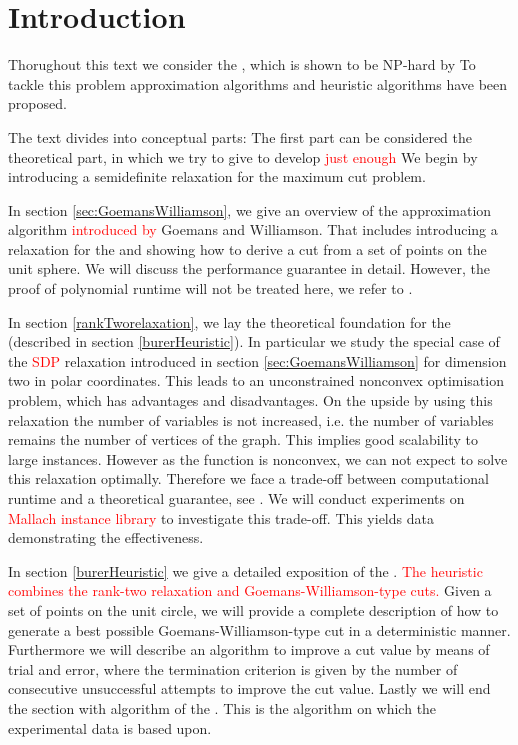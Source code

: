 \documentclass[12pt,a4paper]{article}
\theoremstyle{mythm}
\begin{document}
\tableofcontents

\section{Introduction} 
Thorughout this text we consider the \mcp, which is shown to be NP-hard by \cite{Garey1974}
To tackle this problem approximation algorithms and heuristic algorithms have been proposed.

The text divides into conceptual parts: The first part can be considered the theoretical part, in which we try to give to develop \textcolor{red}{just enough }
We begin by introducing a semidefinite relaxation for the maximum cut problem.

In section \ref{sec:GoemansWilliamson}, we give an overview of the approximation algorithm \textcolor{red}{introduced by} Goemans and Williamson. 
That includes introducing a \sdp relaxation for the \mcp and showing how to derive a cut from a set of points on the unit sphere.
We will discuss the performance guarantee in detail. 
However, the proof of polynomial runtime will not be treated here, we refer to \cite{Korte2018}.

In section \ref{rankTworelaxation}, we lay the theoretical foundation for the \BH (described in section \ref{burerHeuristic}).
In particular we study the special case of the \textcolor{red}{SDP} relaxation introduced in section \ref{sec:GoemansWilliamson} for dimension two in polar coordinates.
This leads to an unconstrained nonconvex optimisation problem, which has advantages and disadvantages.
On the upside by using this relaxation the number of variables is not increased, 
i.e. the number of variables remains the number of vertices of the graph.
This implies good scalability to large instances.
However as the function is nonconvex, we can not expect to solve this relaxation optimally.
Therefore we face a trade-off between computational runtime and a theoretical guarantee, see \cite[p. 506]{Burer2002}.
We will conduct experiments on \textcolor{red}{Mallach instance library} to investigate this trade-off. This yields data demonstrating the effectiveness.

In section \ref{burerHeuristic} we give a detailed exposition of the \BH.
\textcolor{red}{The heuristic combines the rank-two relaxation and Goemans-Williamson-type cuts.} 
Given a set of points on the unit circle, we will provide a complete description of how to generate a best possible Goemans-Williamson-type cut in a deterministic manner. 
Furthermore we will describe an algorithm to improve a cut value by means of trial and error, where the termination criterion is given by the number of consecutive unsuccessful
attempts to improve the cut value.
Lastly we will end the section with algorithm of the \BH.
This is the algorithm on which the experimental data is based upon.
\end{document}
